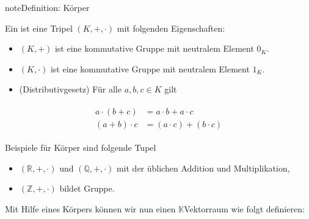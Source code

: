 \documentclass[letterpaper,10pt,english]{jupyterBook}
\begin{document}
\begin{sphinxadmonition}{note}{Definition: Körper}

Ein  ist eine Tripel \((K, +, \cdot)\) mit folgenden Eigenschaften:
\begin{itemize}
\item {} 
\((K, +)\) ist eine kommutative Gruppe mit neutralem Element \(0_K\).

\item {} 
\((K, \cdot)\) ist eine kommutative Gruppe mit neutralem Element \(1_K\).

\item {} 
(Distributivgesetz) Für alle \(a,b,c\in K\) gilt

\end{itemize}
\begin{equation*}
\begin{split}\begin{split}a\cdot (b+c) & = a\cdot b + a\cdot c\\
(a+b)\cdot c & = (a\cdot c) + (b\cdot c)\end{split}\end{split}
\end{equation*}\end{sphinxadmonition}

Beispiele für Körper sind folgende Tupel
\begin{itemize}
\item {} 
\((\mathbb{R}, +, \cdot)\) und \((\mathbb{Q}, +, \cdot)\)  mit der üblichen Addition und Multiplikation,

\item {} 
\((\mathbb{Z}, +, \cdot)\) bildet  Gruppe.

\end{itemize}

Mit Hilfe eines Körpers können wir nun einen \(\mathbb{K}\)\sphinxhyphen{}Vektorraum wie folgt definieren:
\end{document}
